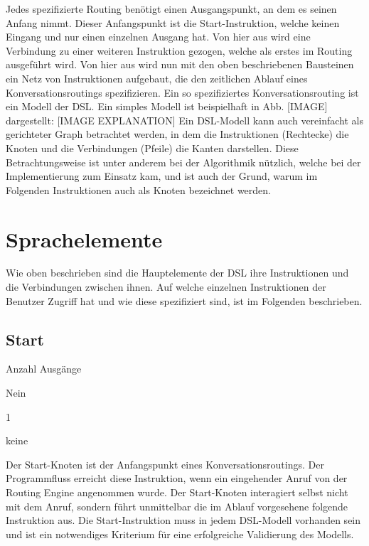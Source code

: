 \newline
Jedes spezifizierte Routing benötigt einen Ausgangspunkt, an dem es seinen Anfang nimmt. Dieser Anfangspunkt ist die Start-Instruktion, welche keinen Eingang und nur einen einzelnen Ausgang hat. Von hier aus wird eine Verbindung zu einer weiteren Instruktion gezogen, welche als erstes im Routing ausgeführt wird. Von hier aus wird nun mit den oben beschriebenen Bausteinen ein Netz von Instruktionen aufgebaut, die den zeitlichen Ablauf eines Konversationsroutings spezifizieren. Ein so spezifiziertes Konversationsrouting ist ein Modell der DSL. Ein simples Modell ist beispielhaft in Abb. [IMAGE] dargestellt: [IMAGE EXPLANATION]
\newline
Ein DSL-Modell kann auch vereinfacht als gerichteter Graph betrachtet werden, in dem die Instruktionen (Rechtecke) die Knoten und die Verbindungen (Pfeile) die Kanten darstellen. Diese Betrachtungsweise ist unter anderem bei der Algorithmik nützlich, welche bei der Implementierung zum Einsatz kam, und ist auch der Grund, warum im Folgenden Instruktionen auch als Knoten bezeichnet werden. 

\section{Sprachelemente}
Wie oben beschrieben sind die Hauptelemente der DSL ihre Instruktionen und die Verbindungen zwischen ihnen. Auf welche einzelnen Instruktionen der Benutzer Zugriff hat und wie diese spezifiziert sind, ist im Folgenden beschrieben. 

\subsection{Start}
\begin{labeling}{Anzahl Ausgänge}
\item [Eingang] Nein
\item [Anzahl Ausgänge] 1
\item [Parameter] keine
\item [Beschreibung] Der Start-Knoten ist der Anfangspunkt eines Konversationsroutings. Der Programmfluss erreicht diese Instruktion, wenn ein eingehender Anruf von der Routing Engine angenommen wurde. Der Start-Knoten interagiert selbst nicht mit dem Anruf, sondern führt unmittelbar die im Ablauf vorgesehene folgende Instruktion aus. Die Start-Instruktion muss in jedem DSL-Modell vorhanden sein und ist ein notwendiges Kriterium für eine erfolgreiche Validierung des Modells. 
\end{labeling}

